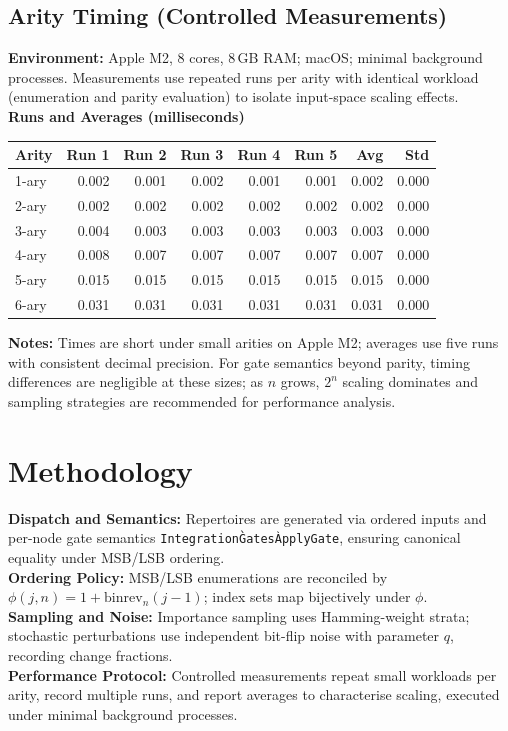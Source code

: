 \documentclass[11pt]{article}
\begin{document}
\subsection*{Arity Timing (Controlled Measurements)}
\textbf{Environment:} Apple M2, 8 cores, 8\,GB RAM; macOS; minimal background processes. Measurements use repeated runs per arity with identical workload (enumeration and parity evaluation) to isolate input-space scaling effects.\\
\textbf{Runs and Averages (milliseconds)}
\begin{center}
\begin{tabular}{lrrrrr rr}
\toprule
Arity & Run 1 & Run 2 & Run 3 & Run 4 & Run 5 & Avg & Std \\
\midrule
1-ary & 0.002 & 0.001 & 0.002 & 0.001 & 0.001 & 0.002 & 0.000 \\
2-ary & 0.002 & 0.002 & 0.002 & 0.002 & 0.002 & 0.002 & 0.000 \\
3-ary & 0.004 & 0.003 & 0.003 & 0.003 & 0.003 & 0.003 & 0.000 \\
4-ary & 0.008 & 0.007 & 0.007 & 0.007 & 0.007 & 0.007 & 0.000 \\
5-ary & 0.015 & 0.015 & 0.015 & 0.015 & 0.015 & 0.015 & 0.000 \\
6-ary & 0.031 & 0.031 & 0.031 & 0.031 & 0.031 & 0.031 & 0.000 \\
\bottomrule
\end{tabular}
\end{center}
\textbf{Notes:} Times are short under small arities on Apple M2; averages use five runs with consistent decimal precision. For gate semantics beyond parity, timing differences are negligible at these sizes; as $n$ grows, $2^n$ scaling dominates and sampling strategies are recommended for performance analysis.



\section{Methodology}
\textbf{Dispatch and Semantics:} Repertoires are generated via ordered inputs and per-node gate semantics \texttt{Integration\`Gates\`ApplyGate}, ensuring canonical equality under MSB/LSB ordering.\\
\textbf{Ordering Policy:} MSB/LSB enumerations are reconciled by $\phi(j,n)=1+\mathrm{binrev}_n(j-1)$; index sets map bijectively under $\phi$.\\
\textbf{Sampling and Noise:} Importance sampling uses Hamming-weight strata; stochastic perturbations use independent bit-flip noise with parameter $q$, recording change fractions.\\
\textbf{Performance Protocol:} Controlled measurements repeat small workloads per arity, record multiple runs, and report averages to characterise scaling, executed under minimal background processes.
\end{document}
